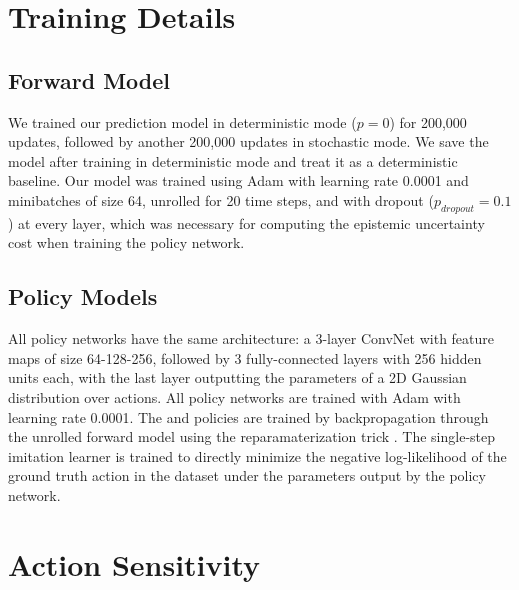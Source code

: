 \documentclass{article} %
\begin{document}
    \section{Training Details}
    \label{training-details-appendix}

    \subsection{Forward Model}
    We trained our prediction model in deterministic mode ($p=0$) for 200,000 updates, followed by another 200,000 updates in stochastic mode.
    We save the model after training in deterministic mode and treat it as a deterministic baseline.
    Our model was trained using Adam \citep{ADAM} with learning rate 0.0001 and minibatches of size 64, unrolled for 20 time steps, and with dropout ($p_{dropout}=0.1$) at every layer, which was necessary for computing the epistemic uncertainty cost when training the policy network.

    \subsection{Policy Models}

    All policy networks have the same architecture: a 3-layer ConvNet with feature maps of size 64-128-256, followed by 3 fully-connected layers with 256 hidden units each, with the last layer outputting the parameters of a 2D Gaussian distribution over actions. All policy networks are trained with Adam with learning rate 0.0001. The \modelnameil and \modelnamedrop policies are trained by backpropagation through the unrolled forward model using the reparamaterization trick \citep{VAE}. The single-step imitation learner is trained to directly minimize the negative log-likelihood of the ground truth action in the dataset under the parameters output by the policy network. %




    \section{Action Sensitivity}
    \label{action-sensitivity-appendix}


\begin{figure}[h]
    \centering
    \label{action-sens}
\end{figure}
\end{document}
